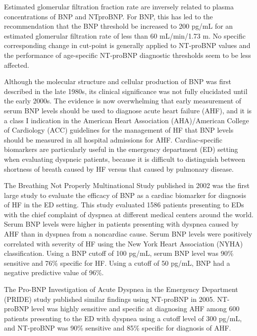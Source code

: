 \documentclass[14pt,a4paper,onecolumn]{extarticle}
\begin{document}
Estimated glomerular filtration fraction rate are inversely related to plasma concentrations of BNP and NTproBNP. For BNP, this has led to the recommendation that the BNP threshold be increased to 200 pg/mL for an estimated glomerular filtration rate of less than 60 mL/min/1.73 m. No specific corresponding change in cut-point is generally applied to NT-proBNP values and the performance of age-specific NT-proBNP diagnostic thresholds seem to be less affected. \citep{DeFilippi2008}

Although the molecular structure and cellular production of BNP was first described in the late 1980s, its clinical significance was not fully elucidated until the early 2000s. The evidence is now overwhelming that early measurement of serum BNP levels should be used to diagnose acute heart failure (AHF), and it is a class I indication in the American Heart Association (AHA)/American College of Cardiology (ACC) guidelines for the management of HF that BNP levels should be measured in all hospital admissions for AHF. Cardiac-specific biomarkers are particularly useful in the emergency department (ED) setting when evaluating dyspneic patients, because it is difficult to distinguish between shortness of breath caused by HF versus that caused by pulmonary disease. \citep{Maisel2018}

The Breathing Not Properly Multinational Study published in 2002 was the first large study to evaluate the efficacy of BNP as a cardiac biomarker for diagnosis of HF in the ED setting. This study evaluated 1586 patients presenting to EDs with the chief complaint of dyspnea at different medical centers around the world. Serum BNP levels were higher in patients presenting with dyspnea caused by AHF than in dyspnea from a noncardiac cause. Serum BNP levels were positively correlated with severity of HF using the New York Heart Association (NYHA) classification. Using a BNP cutoff of 100 pg/mL, serum BNP level was 90\% sensitive and 76\% specific for HF. Using a cutoff of 50 pg/mL, BNP had a negative predictive value of 96\%. \citep{Maisel2002} %

The Pro-BNP Investigation of Acute Dyspnea in the Emergency Department (PRIDE) study published similar findings using NT-proBNP in 2005. NT-proBNP level was highly sensitive and specific at diagnosing AHF among 600 patients presenting to the ED with dyspnea using a cutoff level of 300 pg/mL, and NT-proBNP was 90\% sensitive and 85\% specific for diagnosis of AHF. \citep{Januzzi2005}  %
\end{document}
